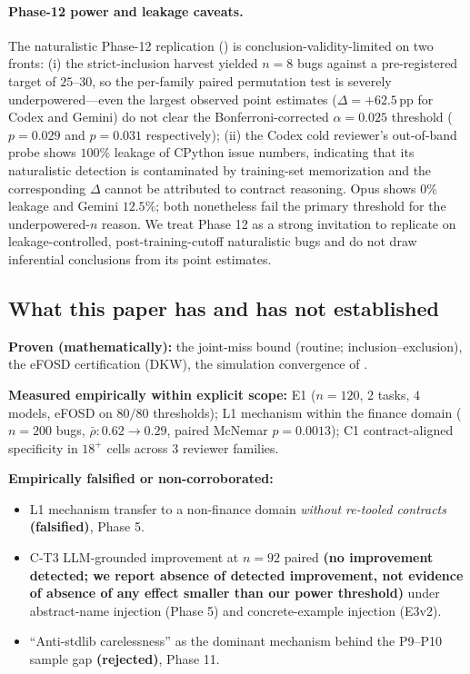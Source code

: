 \paragraph{Phase-12 power and leakage caveats.} The naturalistic Phase-12 replication () is conclusion-validity-limited on two fronts: (i) the strict-inclusion harvest yielded $n = 8$ bugs against a pre-registered target of $25$--$30$, so the per-family paired permutation test is severely underpowered---even the largest observed point estimates ($\Delta = +62.5\,\mathrm{pp}$ for Codex and Gemini) do not clear the Bonferroni-corrected $\alpha = 0.025$ threshold ($p = 0.029$ and $p = 0.031$ respectively); (ii) the Codex cold reviewer's out-of-band probe shows $100\%$ leakage of CPython issue numbers, indicating that its naturalistic detection is contaminated by training-set memorization and the corresponding $\Delta$ cannot be attributed to contract reasoning. Opus shows $0\%$ leakage and Gemini $12.5\%$; both nonetheless fail the primary threshold for the underpowered-$n$ reason. We treat Phase 12 as a strong invitation to replicate on leakage-controlled, post-training-cutoff naturalistic bugs and do not draw inferential conclusions from its point estimates.

\subsection{What this paper has and has not established}
\label{sec:what-established}

\textbf{Proven (mathematically):} the joint-miss bound  (routine; inclusion--exclusion), the eFOSD certification  (DKW), the simulation convergence of .

\textbf{Measured empirically within explicit scope:} E1 ($n=120$, $2$ tasks, $4$ models, eFOSD on $80/80$ thresholds); L1 mechanism within the finance domain ($n=200$ bugs, $\bar{\rho}\!: 0.62 \to 0.29$, paired McNemar $p = 0.0013$); C1 contract-aligned specificity in $18^+$ cells across $3$ reviewer families.

\textbf{Empirically falsified or non-corroborated:}
\begin{itemize}[leftmargin=2em]
\item L1 mechanism transfer to a non-finance domain \emph{without re-tooled contracts} \textbf{(falsified)}, Phase 5.
\item C-T3 LLM-grounded improvement at $n = 92$ paired \textbf{(no improvement detected; we report absence of detected improvement, not evidence of absence of any effect smaller than our power threshold)} under abstract-name injection (Phase 5) and concrete-example injection (E3v2).
\item ``Anti-stdlib carelessness'' as the dominant mechanism behind the P9--P10 sample gap \textbf{(rejected)}, Phase 11.
\end{itemize}

